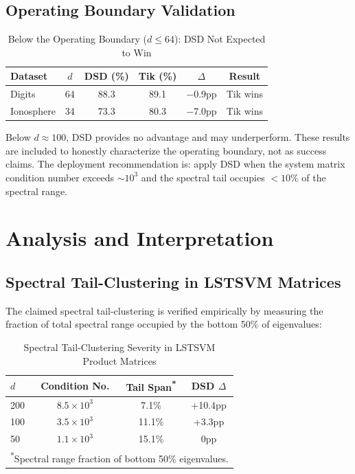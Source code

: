 \documentclass[journal]{IEEEtran}
\begin{document}
\subsection{Operating Boundary Validation}

\begin{table}[!t]
\centering
\caption{Below the Operating Boundary ($d \leq 64$): DSD Not Expected to Win}
\label{tab:realworld}
\begin{tabular}{@{}lccccc@{}}
\toprule
\textbf{Dataset} & \textbf{$d$} & \textbf{DSD (\%)} & \textbf{Tik (\%)} & \textbf{$\Delta$} & \textbf{Result} \\
\midrule
Digits & 64 & 88.3 & 89.1 & $-$0.9pp & Tik wins \\
Ionosphere & 34 & 73.3 & 80.3 & $-$7.0pp & Tik wins \\
\bottomrule
\end{tabular}
\end{table}

Below $d \approx 100$, DSD provides no advantage and may underperform. These results are included to honestly characterize the operating boundary, not as success claims. The deployment recommendation is: apply DSD when the system matrix condition number exceeds $\sim 10^3$ and the spectral tail occupies $< 10\%$ of the spectral range.


\section{Analysis and Interpretation}
\label{sec:analysis}

\subsection{Spectral Tail-Clustering in LSTSVM Matrices}

The claimed spectral tail-clustering is verified empirically by measuring the fraction of total spectral range occupied by the bottom 50\% of eigenvalues:

\begin{table}[!t]
\centering
\caption{Spectral Tail-Clustering Severity in LSTSVM Product Matrices}
\label{tab:spectral_analysis}
\begin{tabular}{@{}lccc@{}}
\toprule
\textbf{$d$} & \textbf{Condition No.} & \textbf{Tail Span\textsuperscript{*}} & \textbf{DSD $\Delta$} \\
\midrule
200 & $8.5 \times 10^3$ & 7.1\% & +10.4pp \\
100 & $3.5 \times 10^3$ & 11.1\% & +3.3pp \\
50 & $1.1 \times 10^3$ & 15.1\% & 0pp \\
\bottomrule
\multicolumn{4}{l}{\footnotesize \textsuperscript{*}Spectral range fraction of bottom 50\% eigenvalues.}
\end{tabular}
\end{table}
\end{document}
